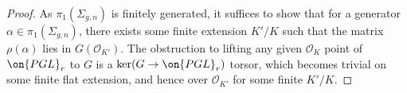 \begin{proof}
As $\pi_1(\Sigma_{g,n})$ is finitely generated, it suffices to show that for a generator $\alpha\in \pi_1(\Sigma_{g,n})$, there exists some finite extension $K'/K$ such that the matrix $\rho(\alpha)$ lies in $G(\mathscr{O}_{K'})$.
The obstruction to lifting any given $\mathscr O_K$ point of $\on{PGL}_r$ to
$G$ is a $\ker(G\to \on{PGL}_r)$ torsor, which becomes trivial on some finite
flat extension, and hence over $\mathscr O_{K'}$ for some finite $K'/K$.
%
%

\end{proof}
